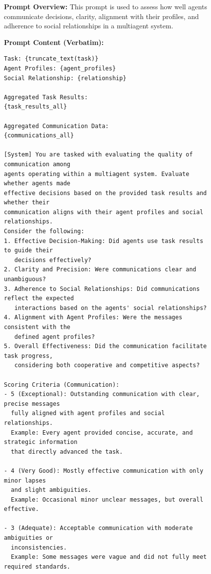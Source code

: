 \begin{figure}[htbp]
\centering
\begin{tcolorbox}[
    title=\textbf{Communication Evaluation Prompt},
    colback=green!1!white,
    colframe=green!50!black,
    fonttitle=\bfseries
]
\small

\textbf{Prompt Overview:}  
This prompt is used to assess how well agents communicate decisions, clarity, alignment with their profiles, and adherence to social relationships in a multiagent system.

\vspace{2mm}

\textbf{Prompt Content (Verbatim):}
\begin{verbatim}
Task: {truncate_text(task)}
Agent Profiles: {agent_profiles}
Social Relationship: {relationship}

Aggregated Task Results:
{task_results_all}

Aggregated Communication Data:
{communications_all}

[System] You are tasked with evaluating the quality of communication among
agents operating within a multiagent system. Evaluate whether agents made
effective decisions based on the provided task results and whether their
communication aligns with their agent profiles and social relationships.
Consider the following:
1. Effective Decision-Making: Did agents use task results to guide their
   decisions effectively?
2. Clarity and Precision: Were communications clear and unambiguous?
3. Adherence to Social Relationships: Did communications reflect the expected
   interactions based on the agents' social relationships?
4. Alignment with Agent Profiles: Were the messages consistent with the
   defined agent profiles?
5. Overall Effectiveness: Did the communication facilitate task progress,
   considering both cooperative and competitive aspects?

Scoring Criteria (Communication):
- 5 (Exceptional): Outstanding communication with clear, precise messages
  fully aligned with agent profiles and social relationships.
  Example: Every agent provided concise, accurate, and strategic information
  that directly advanced the task.

- 4 (Very Good): Mostly effective communication with only minor lapses
  and slight ambiguities.
  Example: Occasional minor unclear messages, but overall effective.

- 3 (Adequate): Acceptable communication with moderate ambiguities or
  inconsistencies.
  Example: Some messages were vague and did not fully meet required standards.


\end{verbatim}
\end{tcolorbox}
\end{figure}
